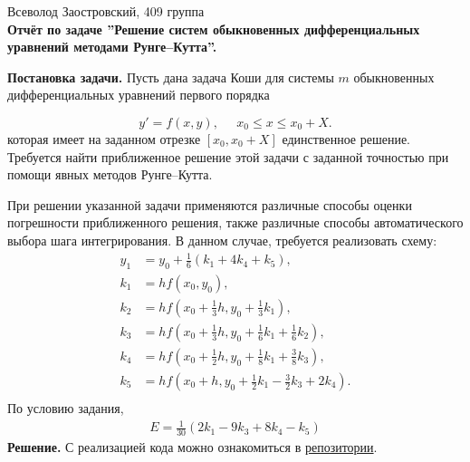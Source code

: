 \documentclass[14pt,a4paper]{extarticle}
\newcommand{\1}{\mathbbm{1}}
\begin{document}
\begin{center}

    {Всеволод Заостровский, 409 группа}\\
    {\bfseries Отчёт по задаче ''Решение систем обыкновенных дифференциальных уравнений методами Рунге--Кутта''.\\}
    \vspace{1cm}

\end{center}

\textbf{Постановка задачи.} Пусть дана задача Коши для системы $m$ обыкновенных 
дифференциальных уравнений первого порядка

\begin{equation}
    y' = f(x, y), \;\;\;\;\; x_0 \leq x \leq x_0 + X .
\end{equation}
которая имеет на заданном отрезке $[x_0, x_0+X]$ единственное решение. Требуется
найти приближенное решение этой задачи с заданной точностью при помощи
явных методов Рунге–Кутта.
\par
При решении указанной задачи применяются различные способы оценки
погрешности приближенного решения, также различные способы автоматического 
выбора шага интегрирования. В данном случае, требуется реализовать схему:
\begin{align*}
    y_1 &= y_0 + \frac{1}{6} (k_1 + 4 k_4 + k_5), \\
    k_1 &= h f(x_0, y_0), \\
    k_2 &= h f\left( x_0 + \frac{1}{3}h, y_0 + \frac{1}{3} k_1\right), \\
    k_3 &= h f\left( x_0 + \frac{1}{3}h, y_0 + \frac{1}{6} k_1 + \frac{1}{6} k_2\right), \\
    k_4 &= h f\left( x_0 + \frac{1}{2}h, y_0 + \frac{1}{8} k_1 + \frac{3}{8} k_3\right), \\
    k_5 &= h f\left( x_0 +            h, y_0 + \frac{1}{2} k_1 - \frac{3}{2} k_3 + 2 k_4\right). \\
\end{align*}
По условию задания, 
\begin{align*}
    E = \frac{1}{30} (2 k_1 - 9 k_3 + 8 k_4 - k_5)
\end{align*}
\textbf{Решение.} С реализацией кода можно ознакомиться 
в \href{https://github.com/VsevolodZaostrovsky/NumericalMethods/tree/main/Differential%20Equations/Code/src}{репозитории}. 
\end{document}
